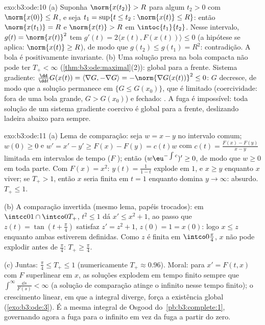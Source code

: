 \begin{solution}{exo:b3:ode:10}
(a) Suponha $\norm{x(t_2)} > R$ para algum $t_2 > 0$ com
$\norm{x(0)} \leq R$, e seja $t_1 = \sup\{t \leq t_2 :
\norm{x(t)} \leq R\}$: então $\norm{x(t_1)} = R$ e
$\norm{x(t)} > R$ em $\intoc{t_1}{t_2}$. Nesse intervalo,
$g(t) = \norm{x(t)}^2$ tem $g'(t) = 2\langle x(t),
F(x(t))\rangle \leq 0$ (a hipótese se aplica: $\norm{x(t)}
\geq R$), de modo que $g(t_2) \leq g(t_1) = R^2$: contradição. A
bola é positivamente invariante.
(b) Uma solução presa na bola compacta não pode ter
$T_+ < \infty$ (\cref{thm:b3:ode:maximal}(2)): global
para a frente. Sistema gradiente: $\frac{\dd}{\dd t}G(x(t)) =
\langle\nabla G, -\nabla G\rangle = -\norm{\nabla G(x(t))}^2
\leq 0$: $G$ decresce, de modo que a solução permanece em $\{G \leq
G(x_0)\}$, que é limitado (coercividade: fora de uma bola
grande, $G > G(x_0)$) e fechado: . A fuga é
impossível: toda solução de um sistema gradiente coercivo é
global para a frente, deslizando ladeira abaixo para sempre.
\end{solution}

\begin{solution}{exo:b3:ode:11}
(a) Lema de comparação: seja $w = x - y$ no intervalo
comum; $w(0) \geq 0$ e $w' = x' - y' \geq F(x) - F(y) =
c(t)w$ com $c(t) = \frac{F(x) - F(y)}{x - y}$ limitada em
intervalos de tempo  ($F$ ); então
$(w\eu^{-\int c})' \geq 0$, de modo que $w \geq 0$ em toda parte. Com
$F(x) = x^2$: $y(t) = \frac1{1 - t}$ explode em $1$, e $x
\geq y$ enquanto $x$ viver; se $T_+ > 1$, então $x$ seria
finita em $t = 1$ enquanto domina $y \to \infty$:
absurdo. $T_+ \leq 1$.

(b) A comparação invertida (mesmo lema, papéis trocados):
em $\intcc01\cap\intco0{T_+}$, $t^2 \leq 1$ dá $x' \leq
x^2 + 1$, ao passo que $z(t) = \tan(t + \frac\pi4)$ satisfaz $z' =
z^2 + 1$, $z(0) = 1 = x(0)$: logo $x \leq z$ enquanto
ambas estiverem definidas. Como $z$ é finita em
$\intco0{\frac\pi4}$, $x$ não pode explodir antes de
$\frac\pi4$: $T_+ \geq \frac\pi4$.

(c) Juntas: $\frac\pi4 \leq T_+ \leq 1$ (numericamente $T_+
\approx 0.96$). Moral: para $x' = F(t, x)$ com $F$
superlinear em $x$, as soluções explodem em tempo finito
sempre que $\int^\infty\frac{\dd s}{F(s)} < \infty$ (a
solução de comparação atinge o infinito nesse tempo finito);
o crescimento linear, em que a integral diverge, força a existência
global (\cref{exo:b3:ode:3}). É a mesma integral de Osgood
do~\cref{pb:b3:complete:1}, governando agora a
fuga para o infinito em vez da fuga a partir do zero.
\end{solution}


